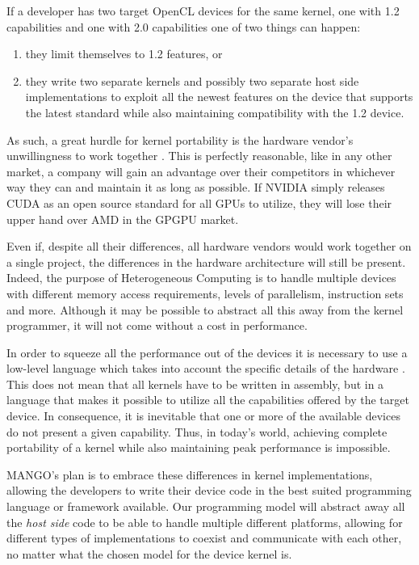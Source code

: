 If a developer has two target OpenCL devices for the same kernel, one with 1.2 capabilities and one with 2.0 capabilities one of two things can happen: 
\begin{enumerate}
    \item they limit themselves to 1.2 features, or
    \item they write two separate kernels and possibly two separate host side implementations to exploit all the newest features on the device that supports the latest standard while also maintaining compatibility with the 1.2 device.
\end{enumerate}
 
As such, a great hurdle for kernel portability is the hardware vendor's unwillingness to work together \cite{but_mummy_cuda}. This is perfectly reasonable, like in any other market, a company will gain an advantage over their competitors in whichever way they can and maintain it as long as possible. If NVIDIA simply releases CUDA as an open source standard for all GPUs to utilize, they will lose their upper hand over AMD in the GPGPU market.

Even if, despite all their differences, all hardware vendors would work together on a single project, the differences in the hardware architecture will still be present. Indeed, the purpose of Heterogeneous Computing is to handle multiple devices with different memory access requirements, levels of parallelism, instruction sets and more. Although it may be possible to abstract all this away from the kernel programmer, it will not come without a cost in performance.

In order to squeeze all the performance out of the devices it is necessary to use a low-level language which takes into account the specific details of the hardware \cite{cuda_open_source_compiler}. This does not mean that all kernels have to be written in assembly, but in a language that makes it possible to utilize all the capabilities offered by the target device. In consequence, it is inevitable that one or more of the available devices do not present a given capability. Thus, in today's world, achieving complete portability of a kernel while also maintaining peak performance is impossible.

MANGO's plan is to embrace these differences in kernel implementations, allowing the developers to write their device code in the best suited programming language or framework available. Our programming model will abstract away all the \textit{host side} code to be able to handle multiple different platforms, allowing for different types of implementations to coexist and communicate with each other, no matter what the chosen model for the device kernel is.

